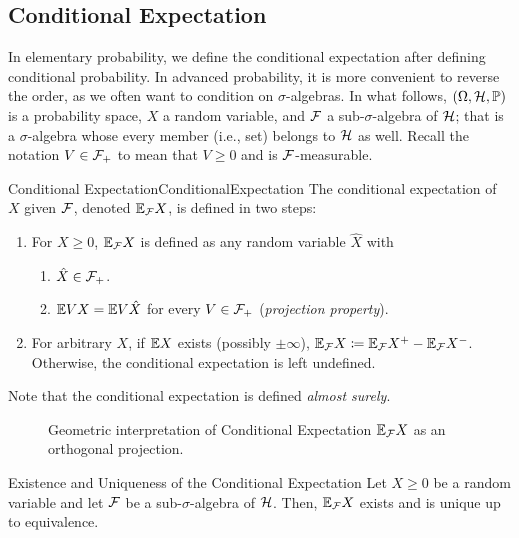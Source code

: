 \subsection{Conditional Expectation}
In elementary probability, we define the conditional expectation after defining conditional probability. In advanced probability, it is more convenient to reverse the order, as we often want to condition on \(\sigma\)-algebras. In what follows, \((\Omega, \mathcal{H}, \mathbb{P})\) is a probability space, \(X\) a random variable, and \(\mathcal{F}\) a sub-\(\sigma\)-algebra of \(\mathcal{H}\); that is a \(\sigma\)-algebra whose every member (i.e., set) belongs to \(\mathcal{H}\) as well. Recall the notation \(V \in \mathcal{F}_+\) to mean that \(V \geq 0\) and is \(\mathcal{F}\)-measurable.

\begin{defn}{Conditional Expectation}{ConditionalExpectation}
The conditional expectation of \(X\) given \(\mathcal{F}\), denoted \(\mathbb{E}_{\mathcal{F}} X\), is defined in two steps:
\begin{enumerate}
    \item For \(X \ge 0\), \(\mathbb{E}_{\mathcal{F}} X\) is defined as any random variable \(\hat{X}\) with
    \begin{enumerate}
        \item \(\hat{X} \in \mathcal{F}_+\).
        \item \(\mathbb{E} V X = \mathbb{E} V \hat{X}\) for every \(V \in \mathcal{F}_+\) (\textit{projection property}).
    \end{enumerate}
    \item For arbitrary \(X\), if \(\mathbb{E} X\) exists (possibly \(\pm \infty\)), \(\mathbb{E}_{\mathcal{F}} X \coloneqq \mathbb{E}_{\mathcal{F}} X^+ - \mathbb{E}_{\mathcal{F}} X^-\). Otherwise, the conditional expectation is left undefined.
\end{enumerate}
\end{defn}

Note that the conditional expectation is defined \textit{almost surely}.

\begin{figure}[H]
    \centering
    
    \caption{Geometric interpretation of Conditional Expectation \(\mathbb{E}_{\mathcal{F}}X\) as an orthogonal projection.}
    \label{fig:ConditionalExpectationProjection}
\end{figure}

\begin{thm}{Existence and Uniqueness of the Conditional Expectation}{}
Let \(X \ge 0\) be a random variable and let \(\mathcal{F}\) be a sub-\(\sigma\)-algebra of \(\mathcal{H}\). Then, \(\mathbb{E}_{\mathcal{F}} X\) exists and is unique up to equivalence.
\end{thm}


